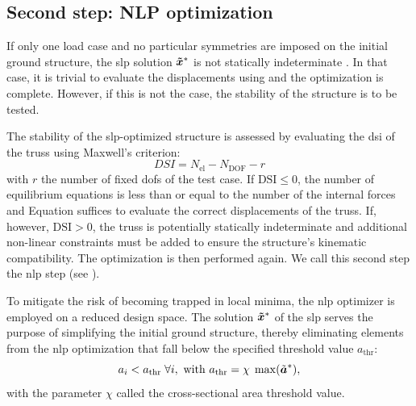 \subsection{Second step: NLP optimization}
If only one load case and no particular symmetries are imposed on the initial ground structure, the \gls{slp} solution $\bm{\tilde{x}}^*$ is not statically indeterminate . In that case, it is trivial to evaluate the displacements using  and the optimization is complete. However, if this is not the case, the stability of the structure is to be tested. 

The stability of the \gls{slp}-optimized structure is assessed by evaluating the \gls{dsi} of the truss using Maxwell's criterion:
\begin{equation}
    DSI= N_{\text{el}} - N_{\text{DOF}} - r
\end{equation}
with $r$ the number of fixed \gls{dofs} of the test case. If $\text{DSI}\leq0$, the number of equilibrium equations is less than or equal to the number of the internal forces and Equation  suffices to evaluate the correct displacements of the truss. If, however, $\text{DSI}>0$, the truss is potentially statically indeterminate and additional non-linear constraints must be added to ensure the structure's kinematic compatibility. The optimization is then performed again. We call this second step the \gls{nlp} step (see ). 

To mitigate the risk of becoming trapped in local minima, the \gls{nlp} optimizer is employed on a reduced design space. The solution $\bm{\tilde{x}}^*$ of the \gls{slp} serves the purpose of simplifying the initial ground structure, thereby eliminating elements from the \gls{nlp} optimization that fall below the specified threshold value $a_{\text{thr}}$:
\begin{equation}
    a_i<a_{\text{thr}} \; \forall i, \text{ with }a_{\text{thr}} = \chi \; \max(\tilde{\bm{a}}^*),
    \label{eq:04_thr}
\end{equation}
with the parameter $\chi$ called the cross-sectional area threshold value.

